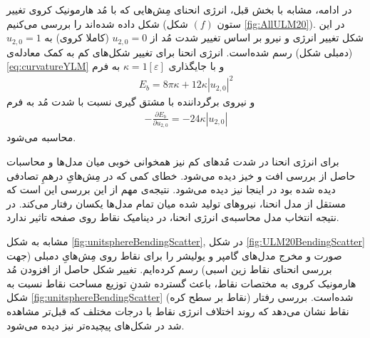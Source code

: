 در ادامه، مشابه با بخش قبل، انرژی انحنای مِش‌هایی که با مُد هارمونیک کروی تغییر شکل داده شده‌اند را بررسی می‌کنیم (ستون
$(f)$
شکل
\ref{fig:AllULM20}).
 در این شکل تغییر انرژی و نیرو بر اساس تغییر شدت مُد از
$u_{2,0}=0$
(کاملا کروی) به
$u_{2,0}=1$
(دمبلی شکل) رسم شده‌است. انرژی انحنا برای تغییر شکل‌های کم به کمک معادله‌ی 
\ref{eq:curvatureYLM}
 و با جایگذاری 
 $\kappa=1[\varepsilon]$
 به فرم
\begin{eqnarray}
E_{b}=8\pi\kappa + 12\kappa|u_{2,0}|^2
\label{eq:curvatureY20}
\end{eqnarray}
و نیروی برگرداننده با مشتق گیری نسبت با شدت مُد به فرم
\begin{eqnarray}
-\frac{\partial E_{b}}{\partial u_{2,0}}= -24\kappa |u_{2,0}|
\label{eq:curvatureForceY20}
\end{eqnarray}
محاسبه می‌شود.

برای انرژی انحنا در شد‌ت مُدهای کم نیز همخوانی خوبی میان مدل‌ها و محاسبات حاصل از بررسی افت و خیز دیده می‌شود. خطای کمی که در مِش‌هایِ درهمِ تصادفی دیده‌ شده بود در اینجا نیز دیده می‌شود.  نتیجه‌ی مهم از این بررسی این است که مستقل از مدل انحنا، نیروهای تولید شده میان تمام مدل‌ها یکسان رفتار می‌کند. در نتیجه انتخاب مدل محاسبه‌ی انرژی انحنا، در دینامیک نقاط روی صفحه تاثیر ندارد.




مشابه به شکل
\ref{fig:unitsphereBendingScatter},
در شکل 
\ref{fig:ULM20BendingScatter}
صورت و مخرج مدل‌های گامپر و یولیشر را برای نقاط روی مِش‌هایِ دمبلی (جهت بررسی انحنای نقاط زین اسبی) رسم کرده‌ایم. تغییر شکل حاصل از افزودن  مُد هارمونیک کروی به مختصات نقاط، باعث گسترده شدنِ توزیع مساحت نقاط نسبت به شکل 
\ref{fig:unitsphereBendingScatter}
(نقاط بر سطح کره) شده‌است. بررسی رفتار نقاط نشان می‌دهد که روند اختلاف انرژی نقاط با درجات مختلف که قبل‌تر مشاهده شد در شکل‌های پیچیده‌تر نیز دیده می‌شود.




